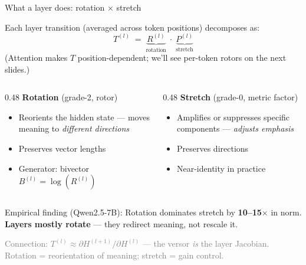 \documentclass[aspectratio=169, 11pt]{beamer}
\newcommand{\bivec}[1]{B^{(#1)}}
\newcommand{\rotor}[1]{R^{(#1)}}
\newcommand{\metric}[1]{P^{(#1)}}
\begin{document}
\begin{frame}{What a layer does: rotation $\times$ stretch}

Each layer transition (averaged across token positions) decomposes as:
\[
  \boxed{T^{(l)} \;=\; \underbrace{\rotor{l}}_{\text{rotation}} \;\cdot\; \underbrace{\metric{l}}_{\text{stretch}}}
\]
\vspace{-0.3em}
{\scriptsize (Attention makes $T$ position-dependent; we'll see per-token rotors on the next slides.)}

\begin{columns}[T]
\begin{column}{0.48\textwidth}
\textbf{Rotation} (grade-2, rotor)
\begin{itemize}
  \item Reorients the hidden state --- moves meaning to \emph{different directions}
  \item Preserves vector lengths
  \item Generator: bivector $\bivec{l} = \log(\rotor{l})$
\end{itemize}
\end{column}
\begin{column}{0.48\textwidth}
\textbf{Stretch} (grade-0, metric factor)
\begin{itemize}
  \item Amplifies or suppresses specific components --- \emph{adjusts emphasis}
  \item Preserves directions
  \item Near-identity in practice
\end{itemize}
\end{column}
\end{columns}

\vspace{0.3em}
\begin{center}
\alert{Empirical finding (Qwen2.5-7B):} Rotation dominates stretch by \textbf{10--15$\times$} in norm.\\
\textbf{Layers mostly rotate} --- they redirect meaning, not rescale it.
\end{center}

\vspace{-0.3em}
{\scriptsize\textcolor{gray}{Connection: $T^{(l)} \approx \partial H^{(l+1)}/\partial H^{(l)}$ --- the versor \emph{is} the layer Jacobian.  Rotation = reorientation of meaning; stretch = gain control.}}
\end{frame}
\end{document}
